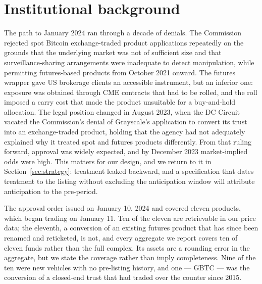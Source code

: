 \documentclass[12pt,a4paper]{article}
\begin{document}
\section{Institutional background}\label{sec:background}

The path to January 2024 ran through a decade of denials. The Commission rejected spot Bitcoin exchange-traded product applications repeatedly on the grounds that the underlying market was not of sufficient size and that surveillance-sharing arrangements were inadequate to detect manipulation, while permitting futures-based products from October 2021 onward. The futures wrapper gave US brokerage clients an accessible instrument, but an inferior one: exposure was obtained through CME contracts that had to be rolled, and the roll imposed a carry cost that made the product unsuitable for a buy-and-hold allocation. The legal position changed in August 2023, when the DC Circuit vacated the Commission's denial of Grayscale's application to convert its trust into an exchange-traded product, holding that the agency had not adequately explained why it treated spot and futures products differently. From that ruling forward, approval was widely expected, and by December 2023 market-implied odds were high. This matters for our design, and we return to it in Section~\ref{sec:strategy}: treatment leaked backward, and a specification that dates treatment to the listing without excluding the anticipation window will attribute anticipation to the pre-period.

The approval order issued on January 10, 2024 and covered eleven products, which began trading on January 11.
Ten of the eleven are retrievable in our price data; the eleventh, a conversion of an existing futures product that has since been renamed and reticketed, is not, and every aggregate we report covers ten of eleven funds rather than the full complex.
Its assets are a rounding error in the aggregate, but we state the coverage rather than imply completeness. Nine of the ten were new vehicles with no pre-listing history, and one — GBTC — was the conversion of a closed-end trust that had traded over the counter since 2015.
\end{document}
